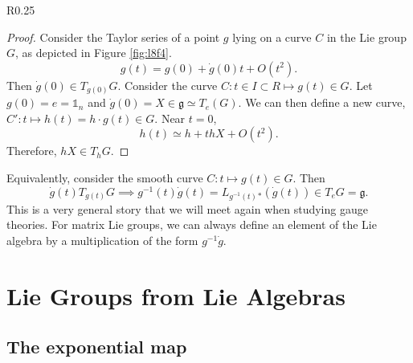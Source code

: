\begin{wrapfigure}{R}{0.25\columnwidth}
  \centering
  \def\svgwidth{0.2\columnwidth}
  
  \caption{}
  \label{fig:l8f4}
\end{wrapfigure}

\begin{proof}
  Consider the Taylor series of a point $g$ lying on a curve $C$ in the Lie group $G$, as depicted in Figure \ref{fig:l8f4}.
  \begin{equation}
    g(t) = g(0) + \dot g(0) t + O(t^2).
  \end{equation}
  Then $\dot g(0) \in T_{g(0)}G$.
  Consider the curve $C\colon t \in I \subset R \mapsto g(t) \in G$. Let $g(0) = e = \mathbb{1}_n$ and $\dot g(0) = X \in \mathfrak{g} \simeq T_e(G)$.
  We can then define a new curve, $C' \colon t \mapsto h(t) = h \cdot g(t) \in G$. Near $t=0$,
  \begin{equation}
    h(t) \simeq h + t hX + O(t^2).
  \end{equation}
  Therefore, $hX \in T_hG$.
\end{proof}

Equivalently, consider the smooth curve $C \colon t \mapsto g(t) \in G$. Then
\begin{equation}
  \dot g(t) T_{g(t)}G \implies g^{-1}(t) \dot g(t) = L_{g^{-1}(t)}{}_* (\dot g(t)) \in T_eG = \mathfrak{g}.
\end{equation}
This is a very general story that we will meet again when studying gauge theories.
For matrix Lie groups, we can always define an element of the Lie algebra by a multiplication of the form $g^{-1} \dot g$.

\chapter{Lie Groups from Lie Algebras}%
\label{cha:lie_groups_from_lie_algebras}

\section{The exponential map}%
\label{sec:the_exponential_map}

